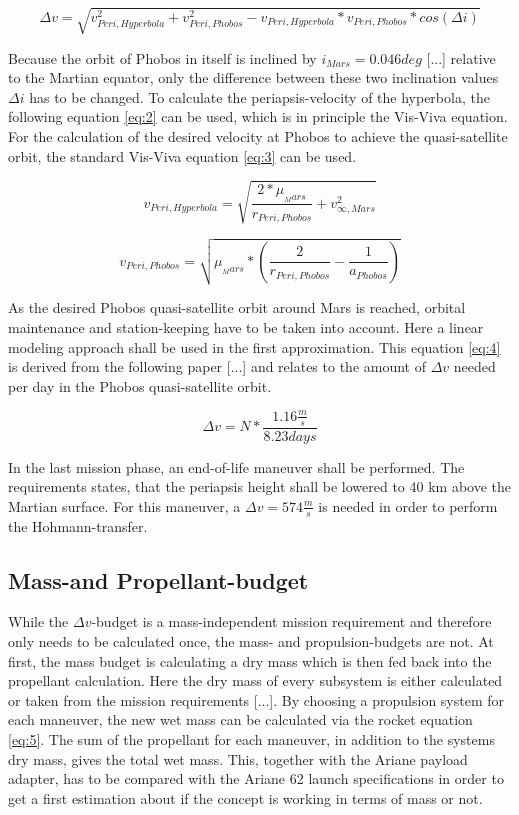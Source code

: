 \begin{equation}
    \Delta v = \sqrt{v_{Peri,Hyperbola}^{2}+v_{Peri,Phobos}^{2}-v_{Peri,Hyperbola}*v_{Peri,Phobos}*cos(\Delta i)}
    \label{eq:1}
\end{equation}


Because the orbit of Phobos in itself is inclined by $i_{Mars} = 0.046 deg$ [...] relative to the Martian equator, only the difference between these two inclination values $\Delta i$ has to be changed. To calculate the periapsis-velocity of the hyperbola, the following equation \ref{eq:2} can be used, which is in principle the Vis-Viva equation. For the calculation of the desired velocity at Phobos to achieve the quasi-satellite orbit, the standard Vis-Viva equation \ref{eq:3} can be used.

\begin{equation}
    v_{Peri,Hyperbola} =\sqrt{\frac{2*\mu_{_Mars}}{r_{Peri,Phobos}}+v_{\infty,Mars}^2}
    \label{eq:2}
\end{equation}

\begin{equation}
    v_{Peri,Phobos} =\sqrt{\mu_{_Mars}*(\frac{2}{r_{Peri,Phobos}}-\frac{1}{a_{Phobos}})}
    \label{eq:3}
\end{equation}

As the desired Phobos quasi-satellite orbit around Mars is reached, orbital maintenance and station-keeping have to be taken into account. Here a linear modeling approach shall be used in the first approximation. This equation \ref{eq:4} is derived from the following paper [...] and relates to the amount of $\Delta v$ needed per day in the Phobos quasi-satellite orbit.

\begin{equation}
    \Delta v = N * \frac{1.16 \frac{m}{s}}{8.23 days}
    \label{eq:4}
\end{equation}

In the last mission phase, an end-of-life maneuver shall be performed. The requirements states, that the periapsis height shall be lowered to 40 km above the Martian surface. For this maneuver, a $\Delta v = 574 \frac{m}{s}$ is needed in order to perform the Hohmann-transfer.

\subsection{Mass-and Propellant-budget}
While the $\Delta v$-budget is a mass-independent mission requirement and therefore only needs to be calculated once, the mass- and propulsion-budgets are not. At first, the mass budget is calculating a dry mass which is then fed back into the propellant calculation. Here the dry mass of every subsystem is either calculated or taken from the mission requirements [...]. By choosing a propulsion system for each maneuver, the new wet mass can be calculated via the rocket equation \ref{eq:5}. The sum of the propellant for each maneuver, in addition to the systems dry mass, gives the total wet mass. This, together with the Ariane payload adapter, has to be compared with the Ariane 62 launch specifications in order to get a first estimation about if the concept is working in terms of mass or not.

